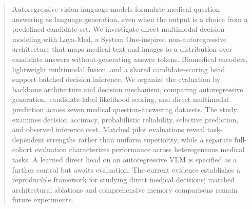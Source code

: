 \begin{abstract}
Autoregressive vision-language models formulate medical question answering as language generation, even when the output is a choice from a predefined candidate set. We investigate direct multimodal decision modeling with Laya-Med, a System One-inspired non-autoregressive architecture that maps medical text and images to a distribution over candidate answers without generating answer tokens. Biomedical encoders, lightweight multimodal fusion, and a shared candidate-scoring head support batched decision inference. We organize the evaluation by backbone architecture and decision mechanism, comparing autoregressive generation, candidate-label likelihood scoring, and direct multimodal prediction across seven medical question-answering datasets. The study examines decision accuracy, probabilistic reliability, selective prediction, and observed inference cost. Matched pilot evaluations reveal task-dependent strengths rather than uniform superiority, while a separate full-cohort evaluation characterizes performance across heterogeneous medical tasks. A learned direct head on an autoregressive VLM is specified as a further control but awaits evaluation. The current evidence establishes a reproducible framework for studying direct medical decisions; matched architectural ablations and comprehensive memory comparisons remain future experiments.
\end{abstract}
